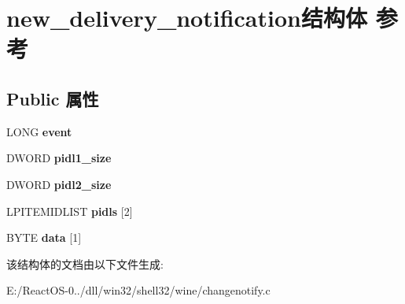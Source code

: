 \hypertarget{structnew__delivery__notification}{}\section{new\+\_\+delivery\+\_\+notification结构体 参考}
\label{structnew__delivery__notification}
\subsection*{Public 属性}
\begin{DoxyCompactItemize}
\item 
\mbox{\label{structnew__delivery__notification_a2a621a9100ec66e4ee9cefa83d3ebfbf}} 
L\+O\+NG {\bfseries event}
\item 
\mbox{\label{structnew__delivery__notification_a3301941ca7289cf0ae6975282b80c057}} 
D\+W\+O\+RD {\bfseries pidl1\+\_\+size}
\item 
\mbox{\label{structnew__delivery__notification_ad5e76c599a4afb61e52e21cf4742f5cb}} 
D\+W\+O\+RD {\bfseries pidl2\+\_\+size}
\item 
\mbox{\label{structnew__delivery__notification_a2666cb21e69eb7d9ac512965fd1634b7}} 
L\+P\+I\+T\+E\+M\+I\+D\+L\+I\+ST {\bfseries pidls} \mbox{[}2\mbox{]}
\item 
\mbox{\label{structnew__delivery__notification_a361f00784a0700f71333ca66b38e6226}} 
B\+Y\+TE {\bfseries data} \mbox{[}1\mbox{]}
\end{DoxyCompactItemize}


该结构体的文档由以下文件生成\+:\begin{DoxyCompactItemize}
\item 
E\+:/\+React\+O\+S-\/0../dll/win32/shell32/wine/changenotify.\+c\end{DoxyCompactItemize}
